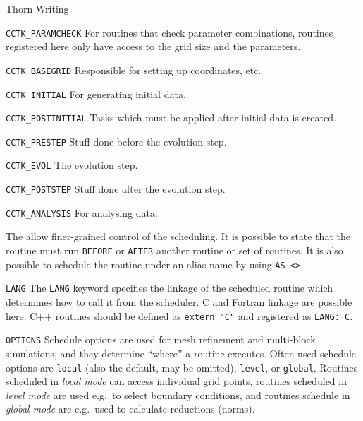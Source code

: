 \begin{cactuspart}{Thorn Writing}
\begin{Lentry}
\item [\texttt{CCTK\_PARAMCHECK}]
For routines that check parameter combinations, routines registered here
only have access to the grid size and the parameters.

\item [\texttt{CCTK\_BASEGRID}]
Responsible for setting up coordinates, etc.

\item [\texttt{CCTK\_INITIAL}]
For generating initial data.

\item [\texttt{CCTK\_POSTINITIAL}]
Tasks which must be applied after initial data is created.

\item [\texttt{CCTK\_PRESTEP}]
Stuff done before the evolution step.

\item [\texttt{CCTK\_EVOL}]
The evolution step.

\item [\texttt{CCTK\_POSTSTEP}]
Stuff done after the evolution step.

\item [\texttt{CCTK\_ANALYSIS}]
For analysing data.

\end{Lentry}

The  allow finer-grained control of the scheduling.  It is
possible to state that the routine must run \texttt{BEFORE} or \texttt{AFTER}
another routine or set of routines.
It is also possible to schedule the routine under an
alias name by using \texttt{AS <>}.

\begin{Lentry}

\item[\texttt{LANG}]
The \texttt{LANG} keyword specifies the linkage of the scheduled routine
which determines how to call it from the scheduler.
C and Fortran linkage are possible here. C++ routines should be defined as
\texttt{extern "C"} and registered as \texttt{LANG: C}.

\item[\texttt{OPTIONS}] Schedule options are used for mesh refinement
  and multi-block simulations, and they determine ``where'' a routine
  executes. Often used schedule options are \texttt{local} (also the
  default, may be omitted), \texttt{level}, or \texttt{global}.
  Routines scheduled in \emph{local mode} can access individual grid
  points, routines scheduled in \emph{level mode} are used e.g.\ to
  select boundary conditions, and routines schedule in \emph{global
    mode} are e.g.\ used to calculate reductions (norms).


\end{Lentry}
\end{cactuspart}
